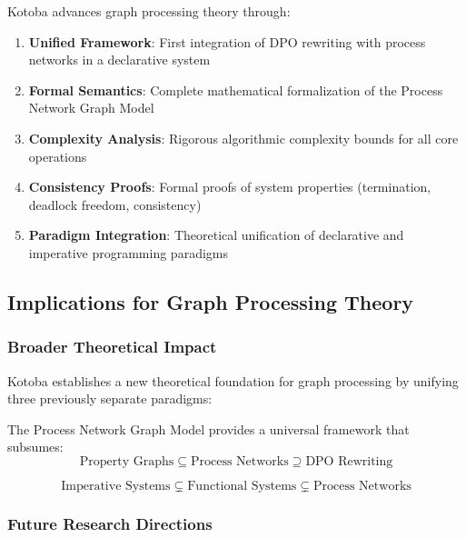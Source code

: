 \documentclass[11pt,a4paper]{article}
\begin{document}
Kotoba advances graph processing theory through:

\begin{enumerate}
\item \textbf{Unified Framework}: First integration of DPO rewriting with process networks in a declarative system
\item \textbf{Formal Semantics}: Complete mathematical formalization of the Process Network Graph Model
\item \textbf{Complexity Analysis}: Rigorous algorithmic complexity bounds for all core operations
\item \textbf{Consistency Proofs}: Formal proofs of system properties (termination, deadlock freedom, consistency)
\item \textbf{Paradigm Integration}: Theoretical unification of declarative and imperative programming paradigms
\end{enumerate}

\subsection{Implications for Graph Processing Theory}
\label{subsec:theory_implications}

\subsubsection{Broader Theoretical Impact}
\label{subsubsec:theory_impact}

Kotoba establishes a new theoretical foundation for graph processing by unifying three previously separate paradigms:

\begin{theorem}
The Process Network Graph Model provides a universal framework that subsumes:
\[
\text{Property Graphs} \subseteq \text{Process Networks} \supseteq \text{DPO Rewriting}
\]
\end{theorem}

\begin{corollary}
\[
\text{Imperative Systems} \subsetneq \text{Functional Systems} \subsetneq \text{Process Networks}
\]
\end{corollary}

\subsubsection{Future Research Directions}
\label{subsubsec:future_theory}
\end{document}
